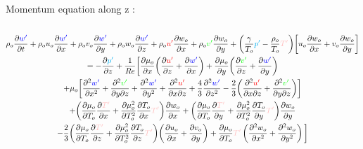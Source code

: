 \documentclass[ border=0pt, a4paper, 11pt]{article}
\numberwithin{equation}{section}
\numberwithin{equation}{section}
\renewcommand{\u}{\textcolor{red}{u'}}
\renewcommand{\v}{\textcolor{green}{v'}}
\newcommand{\w}{\textcolor{blue}{w'}}
\newcommand{\p}{\textcolor{cyan}{p'}}
\newcommand{\T}{\textcolor{pink}{T'}}
\begin{document}
Momentum equation along z :
\begin{multline}
 \\\rho_o\frac{\partial \w }{\partial t} 
 + \rho_ou_o\frac{\partial \w }{\partial x}+\rho_ov_o\frac{\partial \w }{\partial y}+\rho_ow_o\frac{\partial \w }{\partial z} 
 + \rho_o\u \frac{\partial w_o}{\partial x}+\rho_o\v \frac{\partial w_o}{\partial y}
 +\bigg( \frac{\gamma}{T_o} \p  - \frac{\rho_o}{T_o}\T\bigg)\bigg[  u_o\frac{\partial w_o}{\partial x}+ v_o\frac{\partial w_o}{\partial y} \bigg]\\
%
=-\frac{\partial \p }{\partial z} 
%
+ \frac{1}{Re} \bigg[\frac{\partial\mu_o}{\partial x}\bigg( \frac{\partial \u}{\partial z}+ \frac{\partial \w}{\partial x} \bigg) +\frac{\partial\mu_o}{\partial y}\bigg( \frac{\partial \v}{\partial z} + \frac{\partial \w}{\partial y} \bigg)\\
 +\mu_o\bigg[ \frac{\partial^2 \w}{\partial x^2}+\frac{\partial^2 \v }{\partial y\partial  z}+ \frac{\partial^2 \w }{ \partial y^2}+\frac{\partial^2 \u }{ \partial x \partial z}+\frac{4}{3}\frac{\partial^2 \w }{ \partial z^2}-\frac{2}{3}\bigg(\frac{\partial^2 \u}{\partial x\partial z}+\frac{\partial^2 \v}{\partial y\partial z}\bigg)\bigg] \\ 
+\bigg(\frac{\partial  \mu_o }{\partial T_o}\frac{\partial \T }{\partial x} + \frac{\partial  \mu_o^2 }{\partial T_o^2}\frac{\partial T_o }{\partial x} \T \bigg)\frac{\partial w_o}{\partial x}
%
+\bigg(\frac{\partial  \mu_o }{\partial T_o}\frac{\partial \T }{\partial y} + \frac{\partial  \mu_o^2 }{\partial T_o^2}\frac{\partial T_o }{\partial y} \T \bigg)\frac{\partial w_o}{\partial y} \\
%
-\frac{2}{3}\bigg(\frac{\partial  \mu_o }{\partial T_o}\frac{\partial \T }{\partial z} + \frac{\partial  \mu_o^2 }{\partial T_o^2}\frac{\partial T_o }{\partial z} \T \bigg) \bigg(\frac{\partial u_o}{\partial x} +\frac{\partial v_o}{\partial y} \bigg)
 + \frac{\partial  \mu_o }{\partial T_o}\T \left(\frac{\partial^2 w_o}{\partial x^2} +\frac{\partial^2 w_o}{\partial y^2} \right) \bigg]\\
       \label{zmomentum}
\end{multline}
\end{document}
